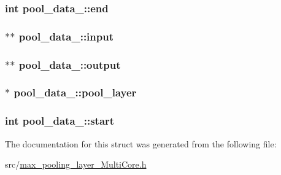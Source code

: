 \subsubsection[{end}]{\setlength{\rightskip}{0pt plus 5cm}int pool\+\_\+data\+\_\+\+::end}\hypertarget{structpool__data___afc58fb17428e6f919cac467049216187}{}\label{structpool__data___afc58fb17428e6f919cac467049216187}
\subsubsection[{input}]{$\ast$$\ast$ pool\+\_\+data\+\_\+\+::input}\hypertarget{structpool__data___aa60f0537a55e5bdb606679aac5126c5d}{}\label{structpool__data___aa60f0537a55e5bdb606679aac5126c5d}
\subsubsection[{output}]{$\ast$$\ast$ pool\+\_\+data\+\_\+\+::output}\hypertarget{structpool__data___ae44c5067647456c8fc44ac3f6842a934}{}\label{structpool__data___ae44c5067647456c8fc44ac3f6842a934}
\subsubsection[{pool\+\_\+layer}]{$\ast$ pool\+\_\+data\+\_\+\+::pool\+\_\+layer}\hypertarget{structpool__data___a4d5584212e4863686cc77663f6a24590}{}\label{structpool__data___a4d5584212e4863686cc77663f6a24590}
\subsubsection[{start}]{\setlength{\rightskip}{0pt plus 5cm}int pool\+\_\+data\+\_\+\+::start}\hypertarget{structpool__data___aec736d302780fa4d45618a638836c9bd}{}\label{structpool__data___aec736d302780fa4d45618a638836c9bd}


The documentation for this struct was generated from the following file\+:\begin{DoxyCompactItemize}
\item 
src/\hyperlink{max__pooling__layer__MultiCore_8h}{max\+\_\+pooling\+\_\+layer\+\_\+\+Multi\+Core.\+h}\end{DoxyCompactItemize}
